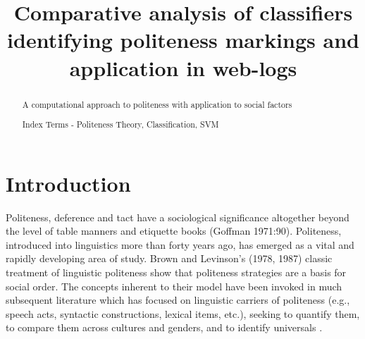 \documentclass[conference]{IEEEtran}
\begin{document}
%
\title{Comparative analysis of classifiers identifying politeness markings and application in web-logs}


\author{
\and
{}
}




\maketitle
\thispagestyle{plain}
\pagestyle{plain}


\begin{abstract}
A computational approach to politeness with application to social factors

Index Terms - Politeness Theory, Classification, SVM
\end{abstract}
\IEEEpeerreviewmaketitle


\section{Introduction}
Politeness, deference and tact have a sociological significance altogether beyond the level of table manners and etiquette books (Goffman 1971:90). Politeness, introduced into linguistics more than forty years ago, has emerged as a vital and rapidly developing area of study. Brown and Levinson's (1978, 1987) classic treatment of linguistic politeness show that politeness strategies are a basis for social order. The concepts inherent to their model have been invoked in much subsequent literature which has focused on linguistic carriers of politeness (e.g., speech acts, syntactic constructions, lexical items, etc.), seeking to quantify them, to compare them across cultures and genders, and to identify universals \cite{Meier}.
\end{document}
